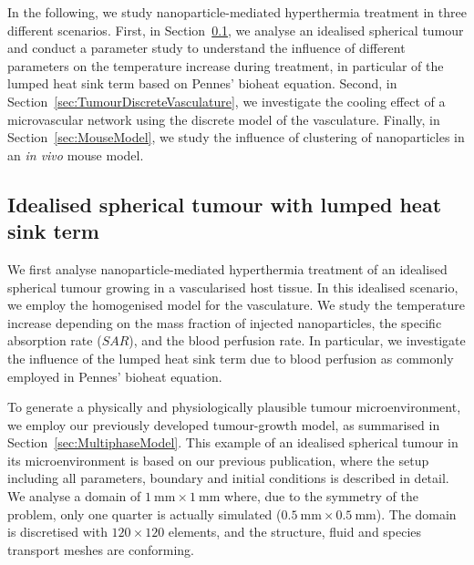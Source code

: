 \documentclass[Times1COL,AMA]{WileyNJDv5} %
\begin{document}
In the following, we study nanoparticle-mediated hyperthermia treatment in three different scenarios.
First, in Section~\ref{sec:IdealisedSphericalTumour}, we analyse an idealised spherical tumour and conduct a parameter study to understand the influence of different parameters on the temperature increase during treatment, in particular of the lumped heat sink term based on Pennes' bioheat equation.
Second, in Section~\ref{sec:TumourDiscreteVasculature}, we investigate the cooling effect of a microvascular network using the discrete model of the vasculature.
Finally, in Section~\ref{sec:MouseModel}, we study the influence of clustering of nanoparticles in an \textit{in vivo} mouse model.

\subsection{Idealised spherical tumour with lumped heat sink term}
\label{sec:IdealisedSphericalTumour}

We first analyse nanoparticle-mediated hyperthermia treatment of an idealised spherical tumour growing in a vascularised host tissue.
In this idealised scenario, we employ the homogenised model for the vasculature.
We study the temperature increase depending on the mass fraction of injected nanoparticles, the specific absorption rate ($SAR$), and the blood perfusion rate.
In particular, we investigate the influence of the lumped heat sink term due to blood perfusion as commonly employed in Pennes' bioheat equation.

To generate a physically and physiologically plausible tumour microenvironment, we employ our previously developed tumour-growth model, as summarised in Section~\ref{sec:MultiphaseModel}.
This example of an idealised spherical tumour in its microenvironment is based on our previous publication, \cite{Wirthl2020} where the setup including all parameters, boundary and initial conditions is described in detail.
We analyse a domain of $\SI{1}{\milli\meter}\times \SI{1}{\milli\meter}$ where, due to the symmetry of the problem, only one quarter is actually simulated ($\SI{0.5}{\milli\meter}\times \SI{0.5}{\milli\meter}$).
The domain is discretised with $120 \times 120$ elements, and the structure, fluid and species transport meshes are conforming.
\end{document}
